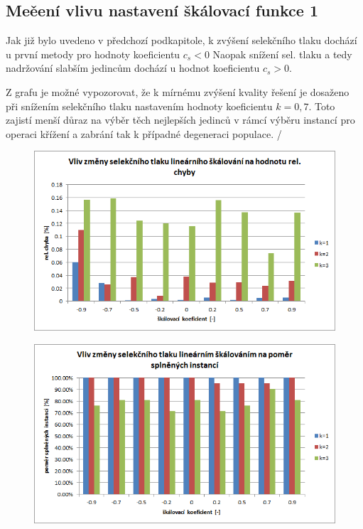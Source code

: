\documentclass[12pt,oneside,a4paper]{article}
\begin{document}
\newpage
\FloatBarrier

\subsection{Meěení vlivu nastavení škálovací funkce 1}

Jak již bylo uvedeno v předchozí podkapitole, k zvýšení selekčního tlaku dochází u první metody pro hodnoty koeficientu $c_s < 0$ Naopak snížení sel. tlaku a tedy nadržování slabším jedincům dochází u hodnot koeficientu $c_s > 0$.

Z grafu je možné vypozorovat, že k mírnému zvýšení kvality řešení je dosaženo při snížením selekčního tlaku nastavením hodnoty koeficientu $k=0,7$. Toto zajistí menší důraz na výběr těch nejlepších jedinců v rámcí výběru instancí pro operaci křížení a zabrání tak k případné degeneraci populace.
/

\begin{figure}[ht]
\centering
\includegraphics[scale=0.9]{obr/linscale-err.png}
\end{figure}

\begin{figure}[ht]
\centering
\includegraphics[scale=0.9]{obr/linscale-sat.png}
\end{figure}
\newpage
\FloatBarrier
\end{document}
